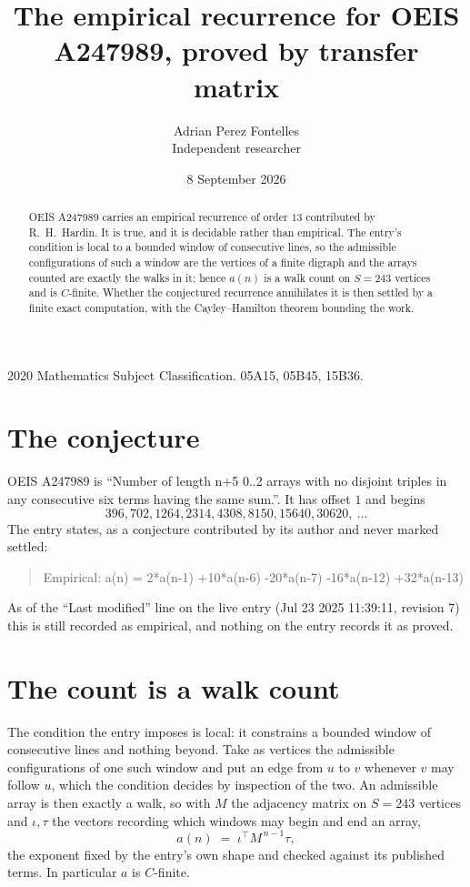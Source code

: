 \documentclass[11pt,a4paper]{article}
\title{The empirical recurrence for OEIS A247989, proved by transfer matrix}
\author{Adrian Perez Fontelles\\ \small Independent researcher}
\date{8 September 2026}
\theoremstyle{plain}
\theoremstyle{definition}
\begin{document}
\maketitle

\begin{abstract}
OEIS A247989 carries an empirical recurrence of order $13$ contributed by R.~H.~Hardin. It is
true, and it is decidable rather than empirical. The entry's condition is local to a bounded window of consecutive lines, so
the admissible configurations of such a window are the vertices of a finite digraph and the
arrays counted are exactly the walks in it; hence $a(n)$ is a walk count on $S=243$ vertices
and is $C$-finite. Whether the conjectured recurrence annihilates it is then settled by a
finite exact computation, with the Cayley--Hamilton theorem bounding the work.
\end{abstract}

\noindent\small 2020 Mathematics Subject Classification. 05A15, 05B45, 15B36.\normalsize

\section{The conjecture}

OEIS A247989 is ``Number of length n+5 0..2 arrays with no disjoint triples in any consecutive six terms having the same sum.''. It has offset $1$ and begins
\[
396, 702, 1264, 2314, 4308, 8150, 15640, 30620,\ \dots
\]
The entry states, as a conjecture contributed by its author and never marked settled:
\begin{quote}
Empirical: a(n) = 2*a(n-1) +10*a(n-6) -20*a(n-7) -16*a(n-12) +32*a(n-13)
\end{quote}
As of the ``Last modified'' line on the live entry (Jul 23 2025 11:39:11, revision 7) this is still
recorded as empirical, and nothing on the entry records it as proved.

\section{The count is a walk count}

The condition the entry imposes is local: it constrains a bounded window of consecutive lines and nothing beyond. Take as
vertices the admissible configurations of one such window and put an edge from $u$ to $v$
whenever $v$ may follow $u$, which the condition decides by inspection of the two. An
admissible array is then exactly a walk, so with $M$ the adjacency matrix on $S=243$ vertices
and $\iota,\tau$ the vectors recording which windows may begin and end an array,
\[
a(n)\;=\;\iota^{\!\top}M^{\,n-1}\tau ,
\]
the exponent fixed by the entry's own shape and checked against its published terms. In
particular $a$ is $C$-finite.
\end{document}
